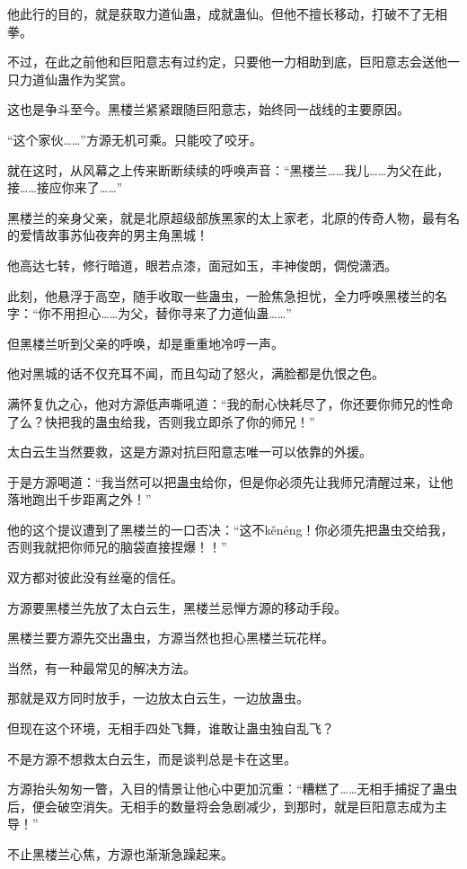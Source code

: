 \begin{this_body}
他此行的目的，就是获取力道仙蛊，成就蛊仙。但他不擅长移动，打破不了无相拳。

不过，在此之前他和巨阳意志有过约定，只要他一力相助到底，巨阳意志会送他一只力道仙蛊作为奖赏。

这也是争斗至今。黑楼兰紧紧跟随巨阳意志，始终同一战线的主要原因。

“这个家伙……”方源无机可乘。只能咬了咬牙。

就在这时，从风幕之上传来断断续续的呼唤声音：“黑楼兰……我儿……为父在此，接……接应你来了……”

黑楼兰的亲身父亲，就是北原超级部族黑家的太上家老，北原的传奇人物，最有名的爱情故事苏仙夜奔的男主角黑城！

他高达七转，修行暗道，眼若点漆，面冠如玉，丰神俊朗，倜傥潇洒。

此刻，他悬浮于高空，随手收取一些蛊虫，一脸焦急担忧，全力呼唤黑楼兰的名字：“你不用担心……为父，替你寻来了力道仙蛊……”

但黑楼兰听到父亲的呼唤，却是重重地冷哼一声。

他对黑城的话不仅充耳不闻，而且勾动了怒火，满脸都是仇恨之色。

满怀复仇之心，他对方源低声嘶吼道：“我的耐心快耗尽了，你还要你师兄的性命了么？快把我的蛊虫给我，否则我立即杀了你的师兄！”

太白云生当然要救，这是方源对抗巨阳意志唯一可以依靠的外援。

于是方源喝道：“我当然可以把蛊虫给你，但是你必须先让我师兄清醒过来，让他落地跑出千步距离之外！”

他的这个提议遭到了黑楼兰的一口否决：“这不kěnéng！你必须先把蛊虫交给我，否则我就把你师兄的脑袋直接捏爆！！”

双方都对彼此没有丝毫的信任。

方源要黑楼兰先放了太白云生，黑楼兰忌惮方源的移动手段。

黑楼兰要方源先交出蛊虫，方源当然也担心黑楼兰玩花样。

当然，有一种最常见的解决方法。

那就是双方同时放手，一边放太白云生，一边放蛊虫。

但现在这个环境，无相手四处飞舞，谁敢让蛊虫独自乱飞？

不是方源不想救太白云生，而是谈判总是卡在这里。

方源抬头匆匆一瞥，入目的情景让他心中更加沉重：“糟糕了……无相手捕捉了蛊虫后，便会破空消失。无相手的数量将会急剧减少，到那时，就是巨阳意志成为主导！”

不止黑楼兰心焦，方源也渐渐急躁起来。


\end{this_body}
